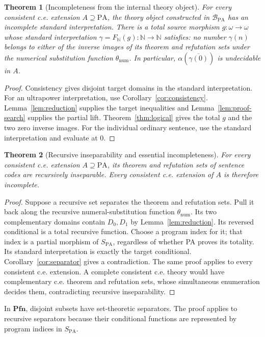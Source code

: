 \documentclass[11pt]{article}
\newtheorem{theorem}{Theorem}[section]
\theoremstyle{definition}\newtheorem{definition}[theorem]{Definition}
\newcommand{\PA}{\mathrm{PA}}
\newcommand{\N}{\mathbb N}
\newcommand{\Pfn}{\mathbf{Pfn}}
\newcommand{\B}{\mathcal B}
\begin{document}
\begin{theorem}[Incompleteness from the internal theory object]\label{thm:arithmetic-incomplete}
For every consistent c.e. extension $A\supseteq\PA$, the theory
object constructed in $\B_{\PA}$ has an incomplete standard
interpretation. There is a total source morphism
$g:\omega\to\omega$ whose standard interpretation
$\gamma=F_{\N}(g):\N\to\N$ satisfies: no number $\gamma(n)$ belongs to either
of the inverse images of its theorem and refutation sets under
the numerical substitution function $\theta_{\mathrm{num}}$. In particular,
$\alpha(\overline{\gamma(0)})$ is undecidable in $A$.
\end{theorem}
\begin{proof}
Consistency gives disjoint target domains in the standard interpretation.
For an ultrapower interpretation, use
Corollary~\ref{cor:consistency}.
Lemma~\ref{lem:reduction} supplies the target inequalities and
Lemma~\ref{lem:proof-search} supplies the partial lift.
Theorem~\ref{thm:logical} gives the total $g$ and the two zero
inverse images. For the individual ordinary sentence, use the
standard interpretation and evaluate at $0$.
\end{proof}

\begin{theorem}[Recursive inseparability and essential incompleteness]\label{thm:arithmetic-insep}
For every consistent c.e. extension $A\supseteq\PA$, its theorem
and refutation sets of sentence codes are recursively inseparable.
Every consistent c.e. extension of $A$ is therefore incomplete.
\end{theorem}
\begin{proof}
Suppose a recursive set separates the theorem and refutation sets.
Pull it back along the recursive numeral-substitution function
$\theta_{\mathrm{num}}$.
Its two complementary domains contain $D_0,D_1$ by
Lemma~\ref{lem:reduction}. Its reversed conditional is a total
recursive function. Choose a program index for it; that index is
a partial morphism of $S_{\PA}$, regardless of whether PA proves
its totality. Its standard interpretation is exactly the target
conditional. Corollary~\ref{cor:separator} gives a contradiction.
The same proof applies to every consistent c.e. extension. A
complete consistent c.e. theory would have complementary c.e.
theorem and refutation sets, whose simultaneous enumeration decides
them, contradicting recursive inseparability.
\end{proof}
In $\Pfn$, disjoint subsets have set-theoretic separators.
The proof applies to recursive separators because their conditional
functions are represented by program indices in $S_{\PA}$.
\end{document}
